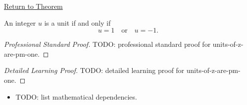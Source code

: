 \newpage
{}
\label{prf:units-of-z-are-pm-one}

\begin{remark*}[Return]
\hyperref[thm:units-of-z-are-pm-one]{Return to Theorem}
\end{remark*}

\begin{theorem*}
An integer $u$ is a unit if and only if
\[
u=1\quad\text{or}\quad u=-1.
\]
\end{theorem*}

\begin{proof}[Professional Standard Proof]
\LRAProofBodyStart
TODO: professional standard proof for units-of-z-are-pm-one.
\end{proof}

\begin{proof}[Detailed Learning Proof]
\LRAProofBodyStart
TODO: detailed learning proof for units-of-z-are-pm-one.
\end{proof}

\begin{remark*}
\end{remark*}

\begin{dependencies}
\begin{itemize}
  \item TODO: list mathematical dependencies.
\end{itemize}
\end{dependencies}

\clearpage
